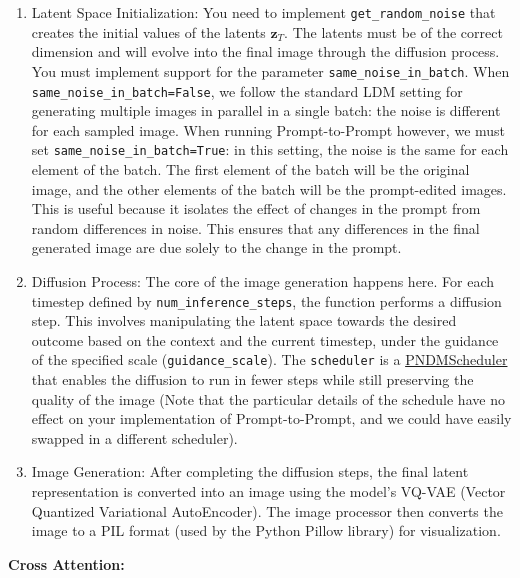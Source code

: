 \documentclass[11pt,addpoints,answers]{exam}
\newcommand{\zv}{\mathbf{z}}
\begin{document}
\begin{questions}
\begin{enumerate}
 \item Latent Space Initialization: You need to implement \lstinline{get_random_noise} that creates the initial values of the latents $\zv_T$. The latents must be of the correct dimension and will evolve into the final image through the diffusion process. You must implement support for the parameter \lstinline{same_noise_in_batch}. When \lstinline{same_noise_in_batch=False}, we follow the standard LDM setting for generating multiple images in parallel in a single batch: the noise is different for each sampled image. When running Prompt-to-Prompt however, we must set \lstinline{same_noise_in_batch=True}: in this setting, the noise is the same for each element of the batch. The first element of the batch will be the original image, and the other elements of the batch will be the prompt-edited images. This is useful because it isolates the effect of changes in the prompt from random differences in noise. This ensures that any differences in the final generated image are due solely to the change in the prompt.
 
  \item Diffusion Process: The core of the image generation happens here. For each timestep defined by \lstinline{num_inference_steps}, the function performs a diffusion step. This involves manipulating the latent space towards the desired outcome based on the context and the current timestep, under the guidance of the specified scale (\lstinline{guidance_scale}). The \lstinline{scheduler} is a \href{https://huggingface.co/docs/diffusers/en/api/schedulers/pndm}{PNDMScheduler} that enables the diffusion to run in fewer steps while still preserving the quality of the image (Note that the particular details of the schedule have no effect on your implementation of Prompt-to-Prompt, and we could have easily swapped in a different scheduler).

  \item Image Generation: After completing the diffusion steps, the final latent representation is converted into an image using the model's VQ-VAE (Vector Quantized Variational AutoEncoder). The image processor then converts the image to a PIL format (used by the Python Pillow library) for visualization. 

\end{enumerate}

\textbf{Cross Attention:} 


\end{questions}
\end{document}
